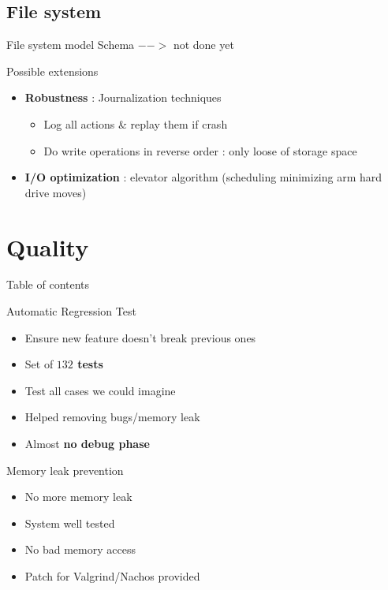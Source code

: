 \documentclass{beamer}
\begin{document}
\subsection{File system}
\begin{frame}{File system model}
    Schema $-->$ not done yet
\end{frame}

\begin{frame}{Possible extensions}
    \begin{itemize}
        \item \textbf{Robustness} : Journalization techniques
            \begin{itemize}
                \item Log all actions \& replay them if crash
                \item Do write operations in reverse order : only loose of
                    storage space
            \end{itemize}
        \item \textbf{I/O optimization} : elevator algorithm (scheduling minimizing arm
            hard drive moves)
    \end{itemize}
\end{frame}

\section{Quality}
\begin{frame}{Table of contents}
    \tableofcontents[currentsection]
\end{frame}

\begin{frame}{Automatic Regression Test}
    \begin{itemize}
        \item Ensure new feature doesn't break previous ones
        \item Set of \textbf{$132$ tests}
        \item Test all cases we could imagine
        \item Helped removing bugs/memory leak
        \item Almost \textbf{no debug phase}
    \end{itemize}
\end{frame}

\begin{frame}{Memory leak prevention}
    \begin{itemize}
        \item No more memory leak
        \item System well tested
        \item No bad memory access
        \item Patch for Valgrind/Nachos provided
    \end{itemize}
\end{frame}
\end{document}
